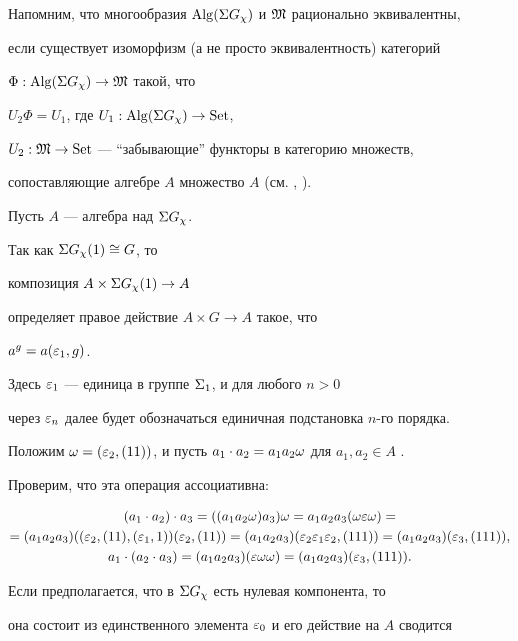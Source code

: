 \begin{pf}


Напомним, что многообразия $\operatorname{Alg}(\Sigma G_{\chi})$ и ${\frak M}$ рационально эквивалентны,


если существует изоморфизм (а не просто эквивалентность) категорий


$\Phi : \operatorname{Alg}(\Sigma G_{\chi}) \rightarrow {\frak M}$ такой, что


$U_2\Phi=U_1$, где $U_1 : \operatorname{Alg}(\Sigma G_{\chi}) \rightarrow \operatorname{Set}$,


$U_2 : {\frak M} \rightarrow \operatorname{Set}$ --- ``забывающие'' функторы в категорию множеств,


сопоставляющие алгебре $A$ множество $A$ (см. \cite{Mal}, \cite{Pin}).


Пусть $A$ --- алгебра над $\Sigma G_{\chi}$.


Так как $\Sigma G_{\chi}(1) \cong G$, то 


композиция $A \times \Sigma G_{\chi}(1) \rightarrow A$


определяет правое действие $A \times G \rightarrow A$ такое, что


$a^g=a(\varepsilon_1,g)$.


Здесь $\varepsilon_1$ --- единица в группе $\Sigma_1$, и для любого $n > 0$


через $\varepsilon_n$ далее будет обозначаться единичная подстановка $n$-го порядка.


Положим $\omega=(\varepsilon_2,(11))$, и пусть $a_1 \cdot a_2=a_1a_2\omega$ для $a_1,a_2 \in A$ .


Проверим, что эта операция ассоциативна:


\begin{gather*}


(a_1 \cdot a_2) \cdot a_3=((a_1a_2\o)a_3)\o=a_1a_2a_3(\o\ep\o)=\\


=(a_1a_2a_3)((\ep_2,(11),(\ep_1,1))(\ep_2,(11))=


(a_1a_2a_3)(\ep_2\ep_1\ep_2,(111))=(a_1a_2a_3)(\ep_3,(111)),\\


a_1 \cdot (a_2 \cdot a_3)=(a_1a_2a_3)(\ep\o\o)=(a_1a_2a_3)(\ep_3,(111)).


\end{gather*}





Если предполагается, что в $\Sigma G_{\chi}$ есть нулевая компонента, то


она состоит из единственного элемента $\varepsilon_0$ и его действие на $A$ сводится



\end{pf}
